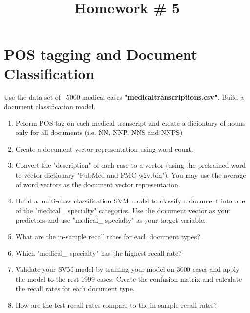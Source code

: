 \documentclass{article}
\title{Homework \# 5} %
\begin{document}
\maketitle %
\thispagestyle{fancy}
\pagestyle{fancy}%

\section{POS tagging and Document Classification} %
Use the  data set of ~5000 medical cases \textbf{"medicaltranscriptions.csv"}. Build a document classification model.

\begin{enumerate}[(1)]

\item Peform POS-tag on each medical transcript and create a diciontary of nouns only for all documents (i.e. NN, NNP, NNS and NNPS)
\item Create a document vector representation using word count. 
\item Convert the "description" of each case to a vector (using the pretrained word to vector dictionary "PubMed-and-PMC-w2v.bin"). You may use the average of word vectors as the document vector representation.
\item Build a multi-class classification SVM model to classify a document into one of the "medical\_ specialty" categories.  Use the document vector as your predictors and use "medical\_ specialty" as your target variable. 
\item What are the in-sample recall rates for each document types?
\item Which "medical\_ specialty" has the highest recall rate?
\item Validate your SVM model by training your model on 3000 cases and apply the model to the rest 1999 cases. Create the confusion matrix and  calculate the recall rates for each document type.
\item How are the test recall rates compare to the in sample recall rates?

\end{enumerate}
\end{document}
